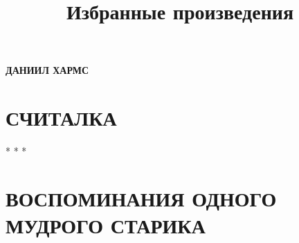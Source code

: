 \documentclass[14pt, openany]{extbook}
\title{Избранные произведения}
\begin{document}
\begin{center}
{\large\textbf{ДАНИИЛ ХАРМС}}
\end{center}

\chapter{СЧИТАЛКА}


\begin{center}
* * *
\end{center}

\chapter{ВОСПОМИНАНИЯ ОДНОГО МУДРОГО СТАРИКА}

\end{document}
